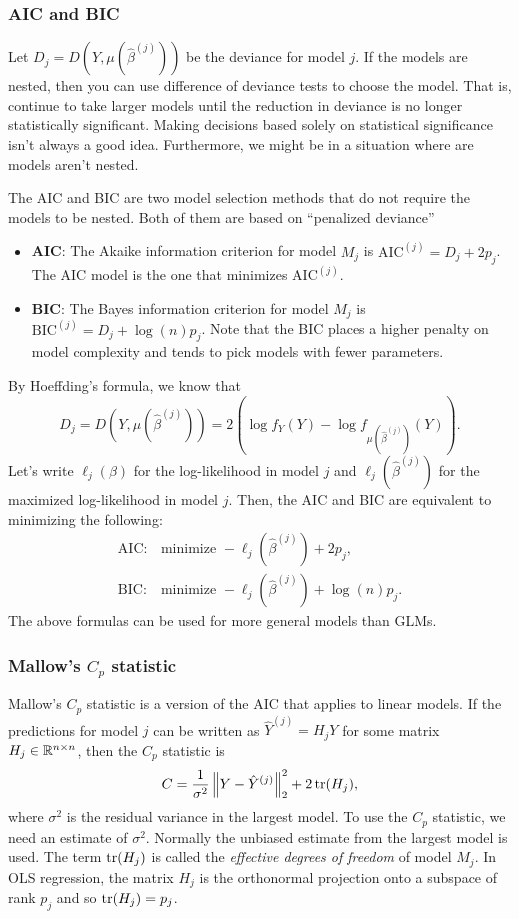 \subsubsection*{AIC and BIC}

Let $D_j = D(Y,\mu(\hat{\beta}^{(j)}))$ be the deviance for model $j$. If the models are nested, then you can use difference of deviance tests to choose the model. That is, continue to take larger models until the reduction in deviance is no longer statistically significant. Making decisions based solely on statistical significance isn't always a good idea. Furthermore, we might be in a situation where are models aren't nested. 

The AIC and BIC are two model selection methods that do not require the models to be nested. Both of them are based on ``penalized deviance''
\begin{itemize}
    \item \textbf{AIC}: The Akaike information criterion for model $M_j$ is $\mathrm{AIC}^{(j)} = D_j +2p_j$. The AIC model is the one that minimizes $\mathrm{AIC}^{(j)}$.
    \item \textbf{BIC}: The Bayes information criterion for model $M_j$ is $\mathrm{BIC}^{(j)} = D_j + \log(n)p_j$. Note that the BIC places a higher penalty on model complexity and tends to pick models with fewer parameters.  
\end{itemize}
By Hoeffding's formula, we know that
\[D_j = D(Y,\mu(\hat{\beta}^{(j)})) = 2\left(\log f_Y(Y) - \log f_{\mu(\hat{\beta}^{(j)})}(Y)\right). \]
Let's write $\ell_j(\beta)$ for the log-likelihood in model $j$ and $\ell_j(\hat{\beta}^{(j)})$ for the maximized log-likelihood in model $j$. Then, the AIC and BIC are equivalent to minimizing the following:
\begin{align*}
    \mathrm{AIC:} &\mbox{minimize } -\ell_j(\hat{\beta}^{(j)}) + 2p_j, \\
    \mathrm{BIC: }&\mbox{minimize } - \ell_j(\hat{\beta}^{(j)}) + \log(n)p_j.
\end{align*}
The above formulas can be used for more general models than GLMs.

\subsubsection*{Mallow's $C_p$ statistic}

Mallow's $C_p$ statistic is a version of the AIC that applies to linear models. If the predictions for model $j$ can be written as $\hat{Y}^{(j)} = H_jY$ for some matrix $H_j \in \mathbb{R}^{n \times n}$, then the $C_p$ statistic is 
\[C  = \frac{1}{\sigma^2} \left\Vert Y -\hat{Y}^{(j)} \right\Vert_2^2 + 2\operatorname{tr}(H_j),\]
where $\sigma^2$ is the residual variance in the largest model. To use the $C_p$ statistic, we need an estimate of $\sigma^2$. Normally the unbiased estimate from the largest model is used. The term $\operatorname{tr}(H_j)$ is called the \emph{effective degrees of freedom} of model $M_j$. In OLS regression, the matrix $H_j$ is the orthonormal projection onto a subspace of rank $p_j$ and so $\operatorname{tr}(H_j)=p_j$.

